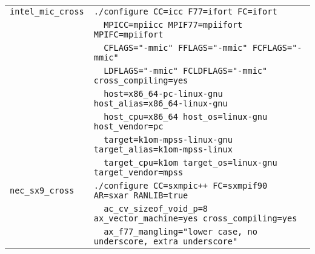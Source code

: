 \documentclass[a4paper]{jarticle}
\begin{document}
\begin{table}[htbp]
\begin{center}
\begin{tabular}{|l|l|}
\verb+intel_mic_cross+    & \verb+./configure CC=icc F77=ifort FC=ifort+ \\
                          & \verb+  MPICC=mpiicc MPIF77=mpiifort MPIFC=mpiifort+ \\
                          & \verb+  CFLAGS="-mmic" FFLAGS="-mmic" FCFLAGS="-mmic"+ \\
                          & \verb+  LDFLAGS="-mmic" FCLDFLAGS="-mmic" cross_compiling=yes+ \\
                          & \verb+  host=x86_64-pc-linux-gnu host_alias=x86_64-linux-gnu+ \\
                          & \verb+  host_cpu=x86_64 host_os=linux-gnu host_vendor=pc+ \\
                          & \verb+  target=k1om-mpss-linux-gnu target_alias=k1om-mpss-linux+ \\
                          & \verb+  target_cpu=k1om target_os=linux-gnu target_vendor=mpss+ \\ \hline
\verb+nec_sx9_cross+      & \verb|./configure CC=sxmpic++ FC=sxmpif90 AR=sxar RANLIB=true | \\
                          & \verb+  ac_cv_sizeof_void_p=8 ax_vector_machine=yes cross_compiling=yes+ \\ 
                          & \verb+  ax_f77_mangling="lower case, no underscore, extra underscore"+ \\ \hline
\end{tabular}
\end{center}
\end{table}
\end{document}
